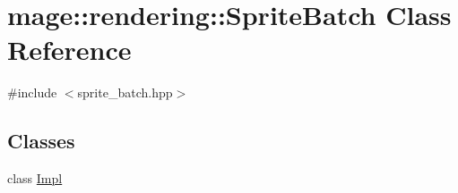 \hypertarget{classmage_1_1rendering_1_1_sprite_batch}{}\section{mage\+:\+:rendering\+:\+:Sprite\+Batch Class Reference}
\label{classmage_1_1rendering_1_1_sprite_batch}


{\ttfamily \#include $<$sprite\+\_\+batch.\+hpp$>$}

\subsection*{Classes}
\begin{DoxyCompactItemize}
\item 
class \mbox{\hyperlink{classmage_1_1rendering_1_1_sprite_batch_1_1_impl}{Impl}}
\end{DoxyCompactItemize}
